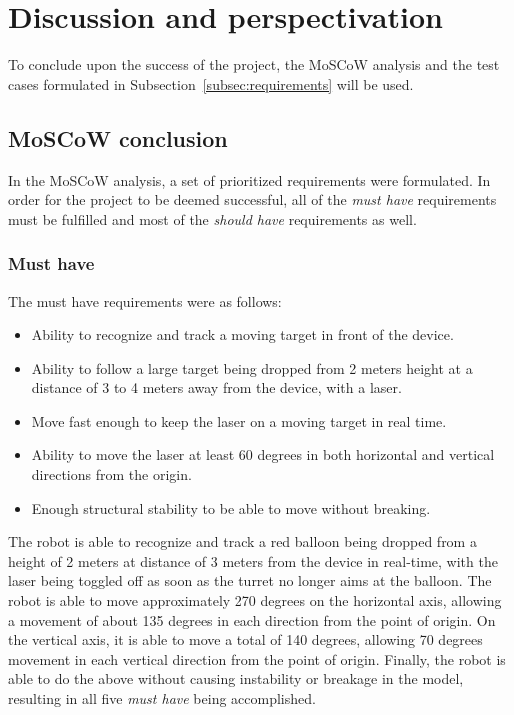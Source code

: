 \section{Discussion and perspectivation}
To conclude upon the success of the project, the MoSCoW analysis and the test cases formulated in Subsection~\ref{subsec:requirements} will be used.

\subsection{MoSCoW conclusion}
In the MoSCoW analysis, a set of prioritized requirements were formulated.
In order for the project to be deemed successful, all of the \textit{must have} requirements must be fulfilled and most of the \textit{should have} requirements as well.

\subsubsection{Must have}
The must have requirements were as follows:
\begin{itemize}
	\item Ability to recognize and track a moving target in front of the device.
	\item Ability to follow a large target being dropped from 2 meters height at a distance of 3 to 4 meters away from the device, with a laser.
	\item Move fast enough to keep the laser on a moving target in real time.
	\item Ability to move the laser at least 60 degrees in both horizontal and vertical directions from the origin.
	\item Enough structural stability to be able to move without breaking.
\end{itemize}

The robot is able to recognize and track a red balloon being dropped from a height of 2 meters at distance of 3 meters from the device in real-time, with the laser being toggled off as soon as the turret no longer aims at the balloon.
The robot is able to move approximately 270 degrees on the horizontal axis, allowing a movement of about 135 degrees in each direction from the point of origin.
On the vertical axis, it is able to move a total of 140 degrees, allowing 70 degrees movement in each vertical direction from the point of origin.
Finally, the robot is able to do the above without causing instability or breakage in the model, resulting in all five \textit{must have} being accomplished.


